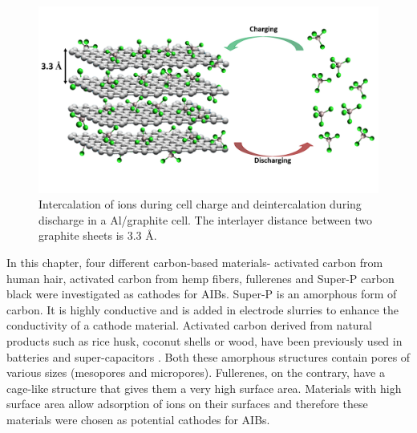 

 \begin{figure}[h]
  \centering
  \includegraphics[width=\textwidth]{Figures/chap5fig/graphmech}
    \caption{Intercalation of  ions during cell charge and deintercalation during discharge in a Al/graphite cell. The interlayer distance between two graphite sheets is 3.3 \AA.}
  \label{Figures/chap5fig:graphmech}
\end{figure}

In this chapter, four different carbon-based materials- activated carbon from human hair, activated carbon from hemp fibers, fullerenes and Super-P carbon black were investigated as cathodes for AIBs. Super-P is an amorphous form of carbon. It is highly conductive and is added in electrode slurries to enhance the conductivity of a cathode material. Activated carbon derived from natural products such as rice husk, coconut shells or wood, have been previously used in batteries and super-capacitors \cite{hussain_development_2019, frackowiak_carbon_2001}. Both these amorphous structures contain pores of various sizes (mesopores and micropores). Fullerenes, on the contrary, have a cage-like structure that gives them a very high surface area. Materials with high surface area allow adsorption of ions on their surfaces and therefore these materials were chosen as potential cathodes for AIBs.   

